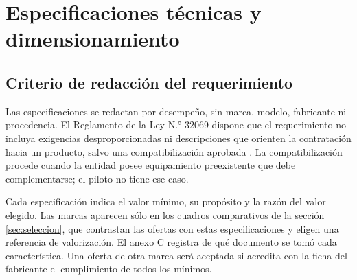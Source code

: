 \clearpage
\section{Especificaciones técnicas y dimensionamiento}\label{sec:especificaciones}
\subsection{Criterio de redacción del requerimiento}
Las especificaciones se redactan por desempeño, sin marca, modelo, fabricante ni procedencia. El Reglamento de la Ley N.° 32069 dispone que el requerimiento no incluya exigencias desproporcionadas ni descripciones que orienten la contratación hacia un producto, salvo una compatibilización aprobada \cite{compatibilizacion}. La compatibilización procede cuando la entidad posee equipamiento preexistente que debe complementarse; el piloto no tiene ese caso.

Cada especificación indica el valor mínimo, su propósito y la razón del valor elegido. Las marcas aparecen sólo en los cuadros comparativos de la sección \ref{sec:seleccion}, que contrastan las ofertas con estas especificaciones y eligen una referencia de valorización. El anexo C registra de qué documento se tomó cada característica. Una oferta de otra marca será aceptada si acredita con la ficha del fabricante el cumplimiento de todos los mínimos.


